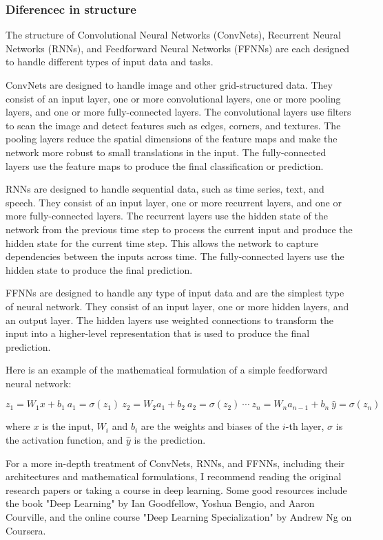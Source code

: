 \documentclass[12pt, a4paper, oneside]{article}
\begin{document}
\subsubsection{Diferencec in structure}
The structure of Convolutional Neural Networks (ConvNets), Recurrent Neural Networks (RNNs), and Feedforward Neural Networks (FFNNs) are each designed to handle different types of input data and tasks.

ConvNets are designed to handle image and other grid-structured data. They consist of an input layer, one or more convolutional layers, one or more pooling layers, and one or more fully-connected layers. The convolutional layers use filters to scan the image and detect features such as edges, corners, and textures. The pooling layers reduce the spatial dimensions of the feature maps and make the network more robust to small translations in the input. The fully-connected layers use the feature maps to produce the final classification or prediction.

RNNs are designed to handle sequential data, such as time series, text, and speech. They consist of an input layer, one or more recurrent layers, and one or more fully-connected layers. The recurrent layers use the hidden state of the network from the previous time step to process the current input and produce the hidden state for the current time step. This allows the network to capture dependencies between the inputs across time. The fully-connected layers use the hidden state to produce the final prediction.

FFNNs are designed to handle any type of input data and are the simplest type of neural network. They consist of an input layer, one or more hidden layers, and an output layer. The hidden layers use weighted connections to transform the input into a higher-level representation that is used to produce the final prediction.

Here is an example of the mathematical formulation of a simple feedforward neural network:

\begin{equation}
z_1 = W_1 x + b_1 \
a_1 = \sigma(z_1) \
z_2 = W_2 a_1 + b_2 \
a_2 = \sigma(z_2) \
\cdots \
z_n = W_n a_{n-1} + b_n \
\hat{y} = \sigma(z_n)
\end{equation}

where $x$ is the input, $W_i$ and $b_i$ are the weights and biases of the $i$-th layer, $\sigma$ is the activation function, and $\hat{y}$ is the prediction.

For a more in-depth treatment of ConvNets, RNNs, and FFNNs, including their architectures and mathematical formulations, I recommend reading the original research papers or taking a course in deep learning. Some good resources include the book "Deep Learning" by Ian Goodfellow, Yoshua Bengio, and Aaron Courville, and the online course "Deep Learning Specialization" by Andrew Ng on Coursera.
\end{document}
